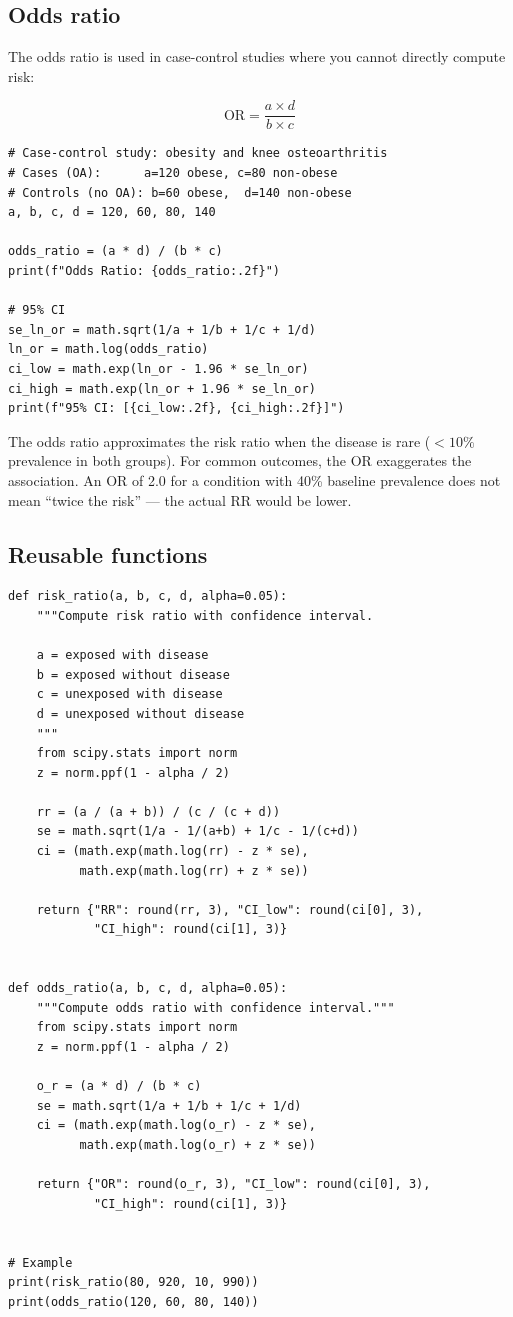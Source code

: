 \subsection{Odds ratio}

The odds ratio is used in case-control studies where you cannot directly compute risk:

\[
\text{OR} = \frac{a \times d}{b \times c}
\]

\begin{verbatim}
# Case-control study: obesity and knee osteoarthritis
# Cases (OA):      a=120 obese, c=80 non-obese
# Controls (no OA): b=60 obese,  d=140 non-obese
a, b, c, d = 120, 60, 80, 140

odds_ratio = (a * d) / (b * c)
print(f"Odds Ratio: {odds_ratio:.2f}")

# 95% CI
se_ln_or = math.sqrt(1/a + 1/b + 1/c + 1/d)
ln_or = math.log(odds_ratio)
ci_low = math.exp(ln_or - 1.96 * se_ln_or)
ci_high = math.exp(ln_or + 1.96 * se_ln_or)
print(f"95% CI: [{ci_low:.2f}, {ci_high:.2f}]")
\end{verbatim}

\begin{clinicalnote}
The odds ratio approximates the risk ratio when the disease is rare ($<10\%$ prevalence in both groups). For common outcomes, the OR exaggerates the association. An OR of 2.0 for a condition with 40\% baseline prevalence does not mean ``twice the risk'' --- the actual RR would be lower.
\end{clinicalnote}

\subsection{Reusable functions}

\begin{verbatim}
def risk_ratio(a, b, c, d, alpha=0.05):
    """Compute risk ratio with confidence interval.

    a = exposed with disease
    b = exposed without disease
    c = unexposed with disease
    d = unexposed without disease
    """
    from scipy.stats import norm
    z = norm.ppf(1 - alpha / 2)

    rr = (a / (a + b)) / (c / (c + d))
    se = math.sqrt(1/a - 1/(a+b) + 1/c - 1/(c+d))
    ci = (math.exp(math.log(rr) - z * se),
          math.exp(math.log(rr) + z * se))

    return {"RR": round(rr, 3), "CI_low": round(ci[0], 3),
            "CI_high": round(ci[1], 3)}


def odds_ratio(a, b, c, d, alpha=0.05):
    """Compute odds ratio with confidence interval."""
    from scipy.stats import norm
    z = norm.ppf(1 - alpha / 2)

    o_r = (a * d) / (b * c)
    se = math.sqrt(1/a + 1/b + 1/c + 1/d)
    ci = (math.exp(math.log(o_r) - z * se),
          math.exp(math.log(o_r) + z * se))

    return {"OR": round(o_r, 3), "CI_low": round(ci[0], 3),
            "CI_high": round(ci[1], 3)}


# Example
print(risk_ratio(80, 920, 10, 990))
print(odds_ratio(120, 60, 80, 140))
\end{verbatim}

